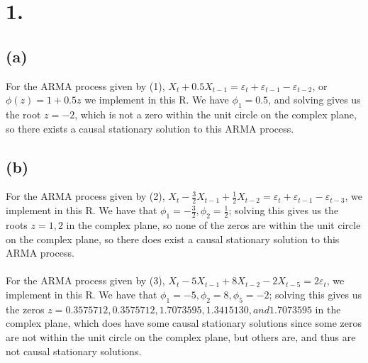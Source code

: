 \documentclass{article}
\begin{document}
\thispagestyle{firstpageheader}

\section*{1.}
{\Large 
\subsection*{(a)}

For the ARMA process given by (1), $X_t + 0.5X_{t-1} = \varepsilon_t + \varepsilon_{t-1} - \varepsilon_{t-2}$, or $\phi(z) = 1 + 0.5z$ we implement in this R. We have $\phi_1 = 0.5$, and solving gives us the root $z = -2$, which is not a zero within the unit circle on the complex plane, so there exists a causal stationary solution to this ARMA process.

\subsection*{(b)}

For the ARMA process given by (2), $X_t - \frac{3}{2}X_{t-1} + \frac{1}{2}X_{t-2}= \varepsilon_t + \varepsilon_{t-1} - \varepsilon_{t-3}$, we implement in this R. We have that $\phi_1 = -\frac{3}{2}, \phi_2 = \frac{1}{2}$; solving this gives us the roots $z = 1, 2$ in the complex plane, so none of the zeros are within the unit circle on the complex plane, so there does exist a causal stationary solution to this ARMA process. \\ \\
For the ARMA process given by (3), $X_t - 5X_{t-1} + 8X_{t-2} - 2X_{t-5}= 2\varepsilon_t$, we implement in this R. We have that $\phi_1 = -5, \phi_2 = 8, \phi_5 = -2$; solving this gives us the zeros $z = 0.3575712, 0.3575712, 1.7073595, 1.3415130, and 1.7073595$ in the complex plane, which does have some causal stationary solutions since some zeros are not within the unit circle on the complex plane, but others are, and thus are not causal stationary solutions.

}
\end{document}
